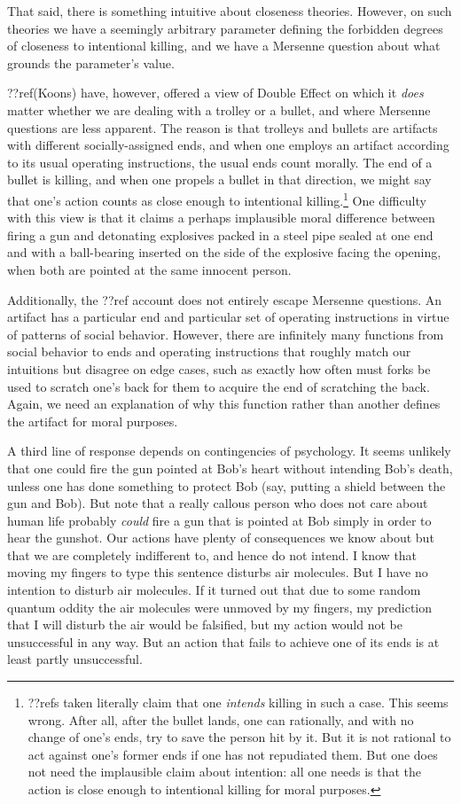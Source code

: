 That said, there is something intuitive about closeness theories. However, on such theories we have a seemingly arbitrary 
parameter defining the forbidden degrees of closeness to intentional killing, and we have a Mersenne question about what
grounds the parameter's value.

??ref(Koons) have, however, offered a view of Double Effect on which it \textit{does} matter whether we are dealing with 
a trolley or a bullet, and where Mersenne questions are less apparent. The reason is that trolleys and bullets are artifacts with different socially-assigned ends, and when 
one employs an artifact according to its usual operating instructions, the usual ends count morally. The end of a bullet is
killing, and when one propels a bullet in that direction, we might say that one's action counts as close enough to intentional 
killing.\footnote{??refs taken literally claim that one \textit{intends} killing in such a case. This seems wrong. After all,
after the bullet lands, one can rationally, and with no change of one's ends, try to save the person hit by it. 
But it is not rational to act against one's former ends if one has not repudiated them. But one does not need the implausible
claim about intention: all one needs is that the action is close enough to intentional killing for moral purposes.} One
difficulty with this view is that it claims a perhaps implausible moral difference between firing a gun and detonating explosives 
packed in a steel pipe sealed at one end and with a ball-bearing inserted on the side of the explosive facing the opening,
when both are pointed at the same innocent person.  

Additionally, the ??ref account does not entirely escape Mersenne questions. An artifact has a particular
end and particular set of operating instructions in virtue of patterns of social behavior. However, there are infinitely many functions 
from social behavior to ends and operating instructions that roughly match our intuitions but disagree on edge cases, such as exactly
how often must forks be used to scratch one's back for them to acquire the end of scratching the back. Again, we need an explanation
of why this function rather than another defines the artifact for moral purposes.

A third line of response depends on contingencies of psychology. It seems unlikely that one could fire the gun pointed at Bob's heart
without intending Bob's death, unless one has done something to protect Bob (say, putting a shield between the gun and Bob). 
But note that a really callous person who does not care about human life probably \textit{could} fire a gun that is 
pointed at Bob simply in order to hear the gunshot. Our actions have
plenty of consequences we know about but that we are completely indifferent to, and hence do not intend. I know that moving
my fingers to type this sentence disturbs air molecules. But I have no intention to disturb air molecules. If it turned out
that due to some random quantum oddity the air molecules were unmoved by my fingers, my prediction that I will disturb the
air would be falsified, but my action would not be unsuccessful in any way. But an action that fails to achieve one of its
ends is at least partly unsuccessful. 

